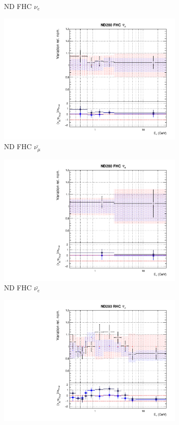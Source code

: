 \begin{figure}[t]
\begin{subfigure}{0.24\textwidth}
  \caption{ND FHC $\nu_{e}$}
  \label{fig:}
\end{subfigure}
\begin{subfigure}{0.24\textwidth}
  \centering
  \includegraphics[width=0.95\linewidth]{figs/rhcmpdat28flux_2}
  \caption{ND FHC $\bar{\nu_{\mu}}$}
  \label{fig:}
\end{subfigure}
\begin{subfigure}{0.24\textwidth}
  \centering
  \includegraphics[width=0.95\linewidth]{figs/rhcmpdat28flux_3}
  \caption{ND FHC $\bar{\nu_{e}}$}
  \label{fig:}
\end{subfigure}
\begin{subfigure}{0.24\textwidth}
  \centering
  \includegraphics[width=0.95\linewidth]{figs/rhcmpdat28flux_4}

\end{subfigure}
\end{figure}
